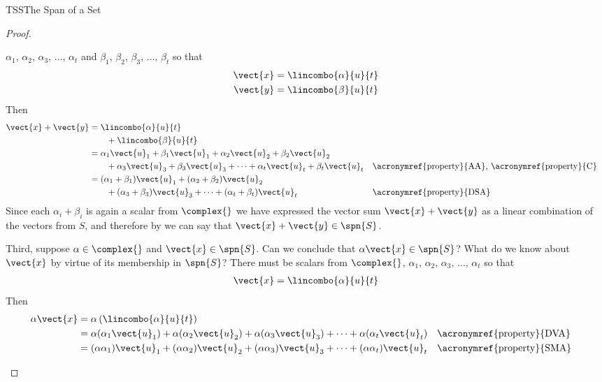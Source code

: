 \begin{subsect}{TSS}{The Span of a Set}
\begin{proof}
\begin{para}
$\alpha_1,\,\alpha_2,\,\alpha_3,\,\ldots,\,\alpha_t$ and
$\beta_1,\,\beta_2,\,\beta_3,\,\ldots,\,\beta_t$ so that
%
\begin{align*}
\vect{x}&=\lincombo{\alpha}{u}{t}\\
\vect{y}&=\lincombo{\beta}{u}{t}
\end{align*}
%
Then
%
\begin{align*}
\vect{x}+\vect{y}&=\lincombo{\alpha}{u}{t}\\
&\quad\quad+\lincombo{\beta}{u}{t}\\
&=\alpha_1\vect{u}_1+\beta_1\vect{u}_1+\alpha_2\vect{u}_2+\beta_2\vect{u}_2\\
&\quad\quad+\alpha_3\vect{u}_3+\beta_3\vect{u}_3+\cdots+\alpha_t\vect{u}_t+\beta_t\vect{u}_t&&\text{\acronymref{property}{AA}, \acronymref{property}{C}}\\
&=(\alpha_1+\beta_1)\vect{u}_1+(\alpha_2+\beta_2)\vect{u}_2\\
&\quad\quad+(\alpha_3+\beta_3)\vect{u}_3+\cdots+(\alpha_t+\beta_t)\vect{u}_t&&\text{\acronymref{property}{DSA}}
\end{align*}
%
Since each $\alpha_i+\beta_i$ is again a scalar from $\complex{\null}$ we have expressed the vector sum $\vect{x}+\vect{y}$ as a linear combination of the vectors from $S$, and therefore by  we can say that $\vect{x}+\vect{y}\in\spn{S}$.\end{para}
%
\begin{para}Third, suppose $\alpha\in\complex{\null}$ and $\vect{x}\in\spn{S}$.  Can we conclude that $\alpha\vect{x}\in\spn{S}$?  What do we know about $\vect{x}$  by virtue of its membership in $\spn{S}$?  There must be scalars from $\complex{\null}$,
$\alpha_1,\,\alpha_2,\,\alpha_3,\,\ldots,\,\alpha_t$ so that
%
\begin{align*}
\vect{x}&=\lincombo{\alpha}{u}{t}\\
\end{align*}
%
Then
%
\begin{align*}
\alpha\vect{x}&=\alpha\left(\lincombo{\alpha}{u}{t}\right)\\
&=\alpha(\alpha_1\vect{u}_1)+\alpha(\alpha_2\vect{u}_2)+\alpha(\alpha_3\vect{u}_3)+\cdots+\alpha(\alpha_t\vect{u}_t)&&\text{\acronymref{property}{DVA}}\\
&=(\alpha\alpha_1)\vect{u}_1+(\alpha\alpha_2)\vect{u}_2+(\alpha\alpha_3)\vect{u}_3+\cdots+(\alpha\alpha_t)\vect{u}_t&&\text{\acronymref{property}{SMA}}\\
\end{align*}

\end{para}
\end{proof}
\end{subsect}
